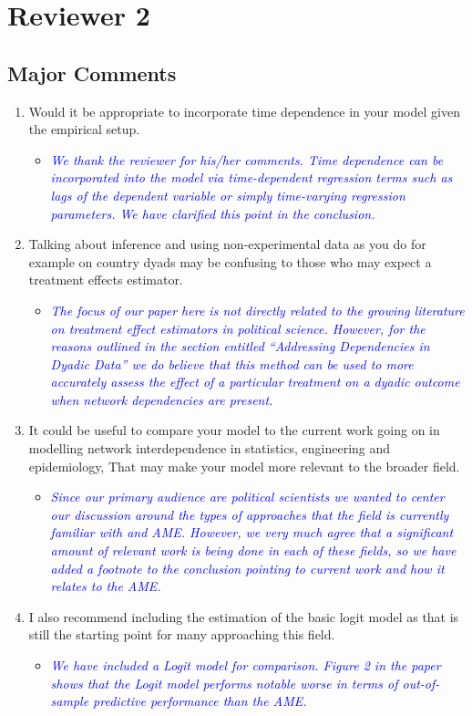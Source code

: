 \section{Reviewer 2}

\subsection{Major Comments}

\begin{enumerate}
	\item Would it be appropriate to incorporate time dependence in your model given the empirical setup.
	\begin{itemize}
		\item \textcolor{blue}{ \emph{
		We thank the reviewer for his/her comments. Time dependence can be incorporated into the model via time-dependent regression terms such as lags of the dependent variable or simply time-varying regression parameters. We have clarified this point in the conclusion.
		}}
	\end{itemize}
	\item Talking about inference and using non-experimental data as you do for example on country dyads may be confusing to those who may expect a treatment effects estimator.
	\begin{itemize}
		\item \textcolor{blue}{ \emph{
		The focus of our paper here is not directly related to the growing literature on treatment effect estimators in political science. However, for the reasons outlined in the section entitled ``Addressing Dependencies in Dyadic Data'' we do believe that this method can be used to more accurately assess the effect of a particular treatment on a dyadic outcome when network dependencies are present. 
		}}
	\end{itemize}	
	\item It could be useful to compare your model to the current work going on in modelling network interdependence in statistics, engineering and epidemiology, That may make your model more relevant to the broader field.
	\begin{itemize}
		\item \textcolor{blue}{ \emph{
		Since our primary audience are political scientists we wanted to center our discussion around the types of approaches that the field is currently familiar with and AME. However, we very much agree that a significant amount of relevant work is being done in each of these fields, so we have added a footnote to the conclusion pointing to current work and how it relates to the AME.
		}}
	\end{itemize}	
	\item I also recommend including the estimation of the basic logit model as that is still the starting point for many approaching this field.
	\begin{itemize}
		\item \textcolor{blue}{ \emph{
		We have included a Logit model for comparison. Figure 2 in the paper shows that the Logit model performs notable worse in terms of out-of-sample predictive performance than the AME.
		}}
	\end{itemize}	
\end{enumerate}